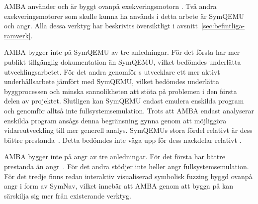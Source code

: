 AMBA använder och är byggt ovanpå exekveringsmotorn \stoe{}. Två andra
exekveringsmotorer som skulle kunna ha används i detta arbete är SymQEMU och
angr. Alla dessa verktyg har beskrivits översiktligt i
avsnitt~\ref{sec:befintliga-ramverk}.

AMBA bygger inte på SymQEMU av tre anledningar. För det första har \stoe{} mer
publikt tillgänglig dokumentation än SymQEMU, vilket bedömdes underlätta
utvecklingsarbetet. För det andra genomför \stoe{}s utvecklare ett mer aktivt
underhållsarbete jämfört med SymQEMU, vilket bedömdes underlätta byggprocessen
och minska sannolikheten att stöta på problemen i den första delen av projektet.
Slutligen kan SymQEMU endast emulera enskilda program och genomför alltså inte
fullsystemsemulation. Trots att AMBA endast analyserar enskilda program ansågs
denna begränsning gynna \stoe{} genom att möjliggöra vidareutveckling till mer
generell analys. SymQEMUs stora fördel relativt \stoe{} är dess bättre
prestanda~\cite{systematic_comparison_symbex}.  Detta bedömdes inte väga upp för
dess nackdelar relativt \stoe{}.

AMBA bygger inte på angr av tre anledningar. För det första har \stoe{} bättre
prestanda än angr~\cite{systematic_comparison_symbex}. För det andra stödjer
inte heller angr fullsystemsemulation. För det tredje finns redan interaktiv
visualiserad symbolisk fuzzing byggd ovanpå angr i form av SymNav, vilket
innebär att AMBA genom att bygga på \stoe{} kan särskilja sig mer från
existerande verktyg.
